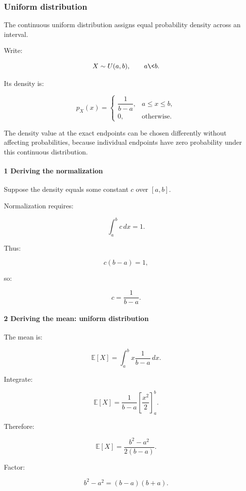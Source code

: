 \subsubsection{Uniform distribution}\label{uniform-distribution}

The continuous uniform distribution assigns equal probability density across an interval.

Write:

\[
 X\sim U(a,b), \qquad a\<b.
\]

Its density is:

\[
 \boxed{ p_X(x)= \begin{cases} \dfrac1{b-a},&a\le x\le b,\\ 0,&\text{otherwise}. \end{cases} }
\]

The density value at the exact endpoints can be chosen differently without affecting probabilities, because individual endpoints have zero probability under this continuous distribution.

\paragraph{1 Deriving the normalization}\label{deriving-the-normalization}

Suppose the density equals some constant \(c\) over \([a,b]\).

Normalization requires:

\[
 \int_a^bc\,dx=1.
\]

Thus:

\[
 c(b-a)=1,
\]

so:

\[
 \boxed{c=\frac1{b-a}}.
\]

\paragraph{2 Deriving the mean: uniform distribution}\label{deriving-the-mean-uniform-distribution}

The mean is:

\[
 \mathbb E[X] = \int_a^b x\frac1{b-a}\,dx.
\]

Integrate:

\[
 \mathbb E[X] = \frac1{b-a} \left[\frac{x^2}{2}\right]_a^b.
\]

Therefore:

\[
 \mathbb E[X] = \frac{b^2-a^2}{2(b-a)}.
\]

Factor:

\[
 b^2-a^2=(b-a)(b+a).
\]

